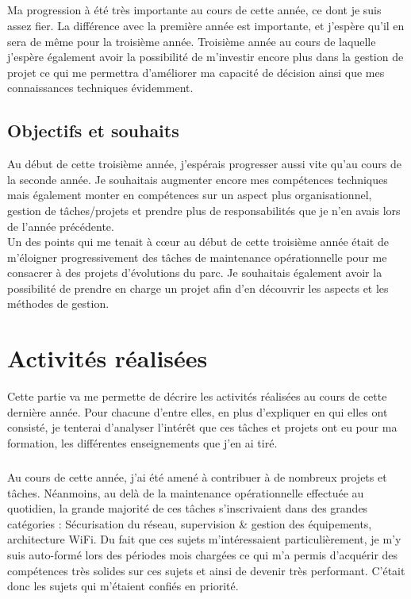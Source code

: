 \documentclass[a4paper,12pt]{report}
\begin{document}
\paragraph{}
Ma progression à été très importante au cours de cette année, ce dont je suis assez fier. La différence avec la première année est importante, et j'espère qu'il en sera de même pour la troisième année. Troisième année au cours de laquelle j'espère également avoir la possibilité de m'investir encore plus dans la gestion de projet ce qui me permettra d'améliorer ma capacité de décision ainsi que mes connaissances techniques évidemment.

\section{Objectifs et souhaits} %
Au début de cette troisième année, j'espérais progresser aussi vite qu'au cours de la seconde année. Je souhaitais augmenter encore mes compétences techniques mais également monter en compétences sur un aspect plus organisationnel, gestion de tâches/projets et prendre plus de responsabilités que je n'en avais lors de l'année précédente.\\
Un des points qui me tenait à cœur au début de cette troisième année était de m'éloigner progressivement des tâches de maintenance opérationnelle pour me consacrer à des projets d'évolutions du parc. Je souhaitais également avoir la possibilité de prendre en charge un projet afin d'en découvrir les aspects et les méthodes de gestion.


\chapter{Activités réalisées}
Cette partie va me permette de décrire les activités réalisées au cours de cette dernière année. Pour chacune d'entre elles, en plus d'expliquer en qui elles ont consisté, je tenterai d'analyser l'intérêt que ces tâches et projets ont eu pour ma formation, les différentes enseignements que j'en ai tiré.
\paragraph{}
Au cours de cette année, j'ai été amené à contribuer à de nombreux projets et tâches. Néanmoins, au delà de la maintenance opérationnelle effectuée au quotidien, la grande majorité de ces tâches s'inscrivaient dans des grandes catégories : Sécurisation du réseau, supervision \& gestion des équipements, architecture WiFi. Du fait que ces sujets m'intéressaient particulièrement, je m'y suis auto-formé lors des périodes mois chargées ce qui m'a permis d'acquérir des compétences très solides sur ces sujets et ainsi de devenir très performant. C'était donc les sujets qui m'étaient confiés en priorité.
\end{document}
